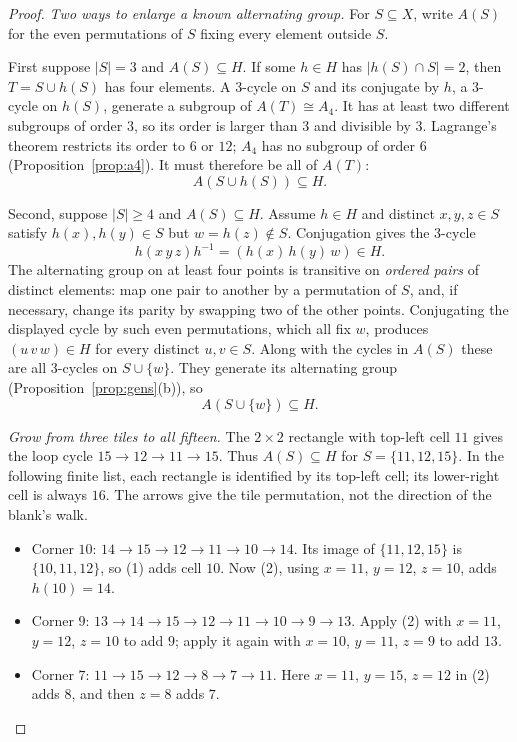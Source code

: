 \begin{proof}
\emph{Two ways to enlarge a known alternating group.}
For $S\subseteq X$, write $A(S)$ for the even
permutations of $S$ fixing every element outside $S$.

First suppose $|S|=3$ and $A(S)\subseteq H$.
If some $h\in H$ has $|h(S)\cap S|=2$,
then $T=S\cup h(S)$ has four elements.
A $3$-cycle on $S$ and its conjugate by $h$,
a $3$-cycle on $h(S)$, generate a subgroup of
$A(T)\cong A_4$. It has at least two different
subgroups of order $3$, so its order is larger
than $3$ and divisible by $3$. Lagrange's
theorem restricts its order to $6$ or $12$;
$A_4$ has no subgroup of order $6$
(Proposition~\ref{prop:a4}).
It must therefore be all of $A(T)$:
\[
A(S\cup h(S))\subseteq H. \tag{1}
\]

Second, suppose $|S|\ge4$ and $A(S)\subseteq H$.
Assume $h\in H$ and distinct $x,y,z\in S$ satisfy
$h(x),h(y)\in S$ but $w=h(z)\notin S$.
Conjugation gives the $3$-cycle
\[
h(x\,y\,z)h^{-1}=(h(x)\,h(y)\,w)\in H.
\]
The alternating group on at least four
points is transitive on \emph{ordered pairs}
of distinct elements: map one pair to
another by a permutation of $S$, and,
if necessary, change its parity by swapping
two of the other points. Conjugating the
displayed cycle by such even permutations,
which all fix $w$, produces
$(u\,v\,w)\in H$ for every distinct $u,v\in S$.
Along with the cycles in $A(S)$ these are
all $3$-cycles on $S\cup\{w\}$.
They generate its alternating group
(Proposition~\ref{prop:gens}(b)), so
\[
A(S\cup\{w\})\subseteq H. \tag{2}
\]

\emph{Grow from three tiles to all fifteen.}
The $2\times2$ rectangle with top-left
cell $11$ gives the loop cycle
$15\to12\to11\to15$. Thus
$A(S)\subseteq H$ for $S=\{11,12,15\}$.
In the following finite list, each rectangle
is identified by its top-left cell; its
lower-right cell is always $16$. The arrows
give the tile permutation, not the direction
of the blank's walk.

\begin{itemize}
\item Corner $10$:
$14\to15\to12\to11\to10\to14$.
Its image of $\{11,12,15\}$ is
$\{10,11,12\}$, so (1) adds cell $10$.
Now (2), using $x=11$, $y=12$, $z=10$,
adds $h(10)=14$.

\item Corner $9$:
$13\to14\to15\to12\to11\to10\to9\to13$.
Apply (2) with $x=11$, $y=12$, $z=10$
to add $9$; apply it again with
$x=10$, $y=11$, $z=9$ to add $13$.

\item Corner $7$:
$11\to15\to12\to8\to7\to11$.
Here $x=11$, $y=15$, $z=12$ in (2)
adds $8$, and then $z=8$ adds $7$.


\end{itemize}
\end{proof}

